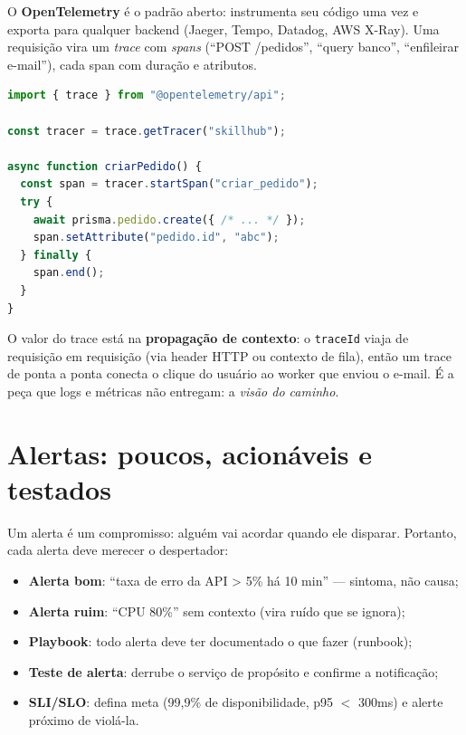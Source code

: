 O \textbf{OpenTelemetry} é o padrão aberto: instrumenta seu código uma vez e
exporta para qualquer backend (Jaeger, Tempo, Datadog, AWS X-Ray). Uma
requisição vira um \emph{trace} com \emph{spans} (``POST /pedidos'',
``query banco'', ``enfileirar e-mail''), cada span com duração e atributos.

\begin{lstlisting}[style=livro, language=TypeScript,
  caption={Span manual com OpenTelemetry.}, label={list:obs-trace}]
import { trace } from "@opentelemetry/api";

const tracer = trace.getTracer("skillhub");

async function criarPedido() {
  const span = tracer.startSpan("criar_pedido");
  try {
    await prisma.pedido.create({ /* ... */ });
    span.setAttribute("pedido.id", "abc");
  } finally {
    span.end();
  }
}
\end{lstlisting}

\begin{caixaconceito}
O valor do trace está na \textbf{propagação de contexto}: o \texttt{traceId}
viaja de requisição em requisição (via header HTTP ou contexto de fila), então
um trace de ponta a ponta conecta o clique do usuário ao worker que enviou o
e-mail. É a peça que logs e métricas não entregam: a \emph{visão do caminho}.
\end{caixaconceito}

\section{Alertas: poucos, acionáveis e testados}

Um alerta é um compromisso: alguém vai acordar quando ele disparar. Portanto,
cada alerta deve merecer o despertador:

\begin{itemize}[leftmargin=*, itemsep=0.4em]
  \item \textbf{Alerta bom}: ``taxa de erro da API > 5\% há 10 min'' — sintoma, não causa;
  \item \textbf{Alerta ruim}: ``CPU 80\%'' sem contexto (vira ruído que se ignora);
  \item \textbf{Playbook}: todo alerta deve ter documentado o que fazer (runbook);
  \item \textbf{Teste de alerta}: derrube o serviço de propósito e confirme a notificação;
  \item \textbf{SLI/SLO}: defina meta (99,9\% de disponibilidade, p95 $<$ 300ms) e alerte próximo de violá-la.
\end{itemize}

